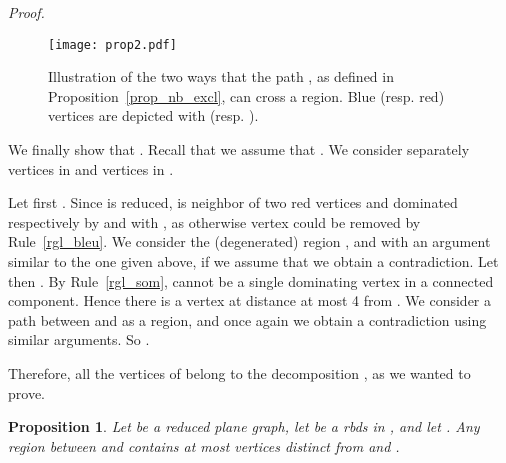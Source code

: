 \documentclass[a4paper,11pt]{article}
\newtheorem{prop} {Proposition}
\newcommand{\rrgl}   [1] {Rule~\ref{#1}\xspace}
\newcommand{\drb}    [0] {rbds\xspace}
\newenvironment{proof}{\noindent \textit{Proof. }}{\hfill\vspace{.2cm}}
\begin{document}
\begin{proof}
\begin{figure}[h]
\begin{center}
   \texttt{[image: prop2.pdf]}
\end{center}
   \caption{Illustration of the two ways that the path , as defined in Proposition~\ref{prop_nb_excl}, can cross a region. Blue (resp. red) vertices are depicted with  (resp. \LARGE{}\normalsize{)}. }
   \label{fig_prop}
\end{figure}

We finally show that . Recall that we assume that .  We consider separately vertices in  and vertices in .

Let first . Since  is reduced,   is neighbor of two red vertices  and  dominated respectively by  and  with , as otherwise vertex  could be removed by \rrgl{rgl_bleu}. We consider the (degenerated) region , and with an argument similar to the one given above, if we assume that  we obtain a contradiction.
Let then . By \rrgl{rgl_som},  cannot be a single dominating vertex in a connected component. Hence there is a vertex  at distance at most 4 from . We consider a path between  and  as a region, and once again we obtain a contradiction using similar arguments. So .

Therefore, all the vertices of  belong to the decomposition , as we wanted to prove.
\end{proof}



\begin{prop}\label{prop_nb_incl}
Let  be a reduced plane graph, let  be a \drb in , and let .
Any region  between  and  contains at most  vertices distinct from  and .
\end{prop}
\end{document}
